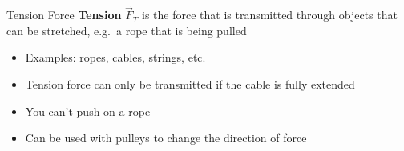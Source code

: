 \documentclass[12pt,compress,aspectratio=169]{beamer}
\begin{document}
%
%



\begin{frame}{Tension Force}
  \textbf{Tension} $\vec F_T$ is the force that is transmitted through objects
  that can be stretched, e.g.\ a rope that is being pulled
  \begin{center}
  \end{center}
  \begin{itemize}
  \item Examples: ropes, cables, strings, etc.
  \item Tension force can only be transmitted if the cable is fully extended
  \item You can't push on a rope
  \item Can be used with pulleys to change the direction of force
  \end{itemize}
\end{frame}
\end{document}
